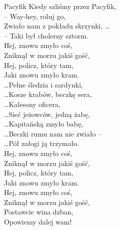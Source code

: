\begin{piosenka}{Pacyfik}
Kiedy szliśmy przez Pacyfik, \\
-- Way-hey, roluj go, \\
Zwiało nam z pokładu skrzynki, \ldots \\
-- Taki był cholerny sztorm. \\

 Hej, znowu zmyło coś, \\
 Zniknął w morzu jakiś gość, \\
 Hej, policz, który tam, \\
 Jaki znowu zmyło kram. \\[\zwrotkaspace]

\ldots Pełne śledzia i sardynki, \\
\ldots Kosze krabów, beczkę sera, \\
\ldots Kalesony oficera, \\
\ldots Sieć jeżowców, jedną żabę, \\
\ldots Kapitańską zmyło babę, \\
\ldots Beczki rumu nam nie zwiało -- \\
\ldots Pół załogi ją trzymało. \\[\zwrotkaspace]

 Hej, znowu zmyło coś, \\
 Zniknął w morzu jakiś gość, \\
 Hej, policz, który tam, \\
 Jaki znowu zmyło kram. \\[\zwrotkaspace]

 Hej, znowu zmyło coś, \\
 Zniknął w morzu jakiś gość, \\
 Postawcie wina dzban, \\
 Opowiemy dalej wam! \\

\end{piosenka}
